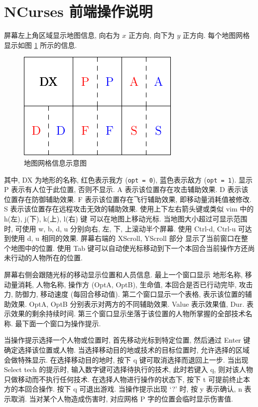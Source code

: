 \documentclass[UTF8, zihao=-4]{ctexart} %
\newcommand{\lcode}{\lstinline} % 段内插入代码
\begin{document}
\section{NCurses 前端操作说明}
\label{s_nc}
屏幕左上角区域显示地图信息, 向右为 $x$ 正方向, 向下为 $y$ 正方向. 
每个地图网格显示如图 \ref{f_grid} 所示的信息.
\begin{figure}
      \centering
      \includegraphics[scale=1.2]{grid.pdf}
      \caption{\label{f_grid}地图网格信息示意图}
\end{figure}
其中, DX 为地形的名称, 红色表示我方 (\lcode{opt = 0}), 蓝色表示敌方 (\lcode{opt = 1}).
显示 P 表示有人位于此位置, 否则不显示. A 表示该位置存在攻击辅助效果.
D 表示该位置存在防御辅助效果. F 表示该位置存在飞行辅助效果, 即移动量消耗值被修改.
S 表示该位置存在远程攻击无效的辅助效果. 使用上下左右箭头键或类似 vim 中的 h(左), j(下), k(上), l(右) 键
可以在地图上移动光标. 当地图大小超过可显示范围时, 可使用 w, b, d, u 分别向右, 左, 下, 上滚动半个屏幕. 
使用 Ctrl-d, Ctrl-u 可达到使用 d, u 相同的效果. 屏幕右端的 XScroll, YScroll 部分
显示了当前窗口在整个地图中的位置. 使用 Tab 键可以自动使光标移动到下一个本回合当前操作方还尚未行动的人物所在的位置.

屏幕右侧会跟随光标的移动显示位置和人员信息. 最上一个窗口显示
地形名称, 移动量消耗, 人物名称, 操作方 (OptA, OptB), 生命值, 本回合是否已行动完毕, 攻击力, 防御力, 移动速度 (每回合移动值).
第二个窗口显示一个表格, 表示该位置的辅助效果. OptA, OptB 分别表示对两方的不同辅助效果. Value 表示效果值, Dur. 表示效果的剩余持续时间.
第三个窗口显示坐落于该位置的人物所掌握的全部技术名称. 最下面一个窗口为操作提示. 

当操作提示选择一个人物或位置时, 首先移动光标到特定位置, 然后通过 Enter 键确定选择该位置或人物. 
当选择移动目的地或技术的目标位置时, 允许选择的区域会做特殊显示. 在选择移动目的地时, 
按下 q 键可取消选择而退回上一步. 当出现 Select tech 的提示时, 输入数字键可选择待执行的技术, 
此时若键入 q, 则对该人物只做移动而不执行任何技术. 在选择人物进行操作的状态下, 
按下 t 可提前终止本方的本回合操作. 按下 q 可退出游戏. 
当操作提示出现 `?' 时, 按 y 表示确认, n 表示取消. 当对某个人物造成伤害时, 对应网格 P 字的位置会临时显示伤害值.
\end{document}

